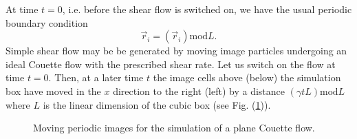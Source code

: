 At time $t=0$, i.e. before the shear flow is switched on, we have the usual
periodic boundary condition
\begin{displaymath}
  \vec{r}_i = (\vec{r}_i) \mathrm{mod}L.
\end{displaymath}
Simple shear flow may be be generated by moving image particles undergoing an
ideal Couette flow with the prescribed shear rate. Let us switch on the flow 
at time $t=0$. Then, at a later time $t$ the image cells above (below)  the
simulation box have moved in the $x$ direction to the right (left) by a
distance $(\gamma tL) \mathrm{mod} L$ where $L$ is the linear dimension of the
cubic box (see Fig. (\ref{fig:NEMD_Periodic})).

\begin{figure}[htbp]
  \begin{center}
    
    \caption{Moving periodic images for the simulation of a plane Couette flow.}
    \label{fig:NEMD_Periodic}
  \end{center}
\end{figure}

